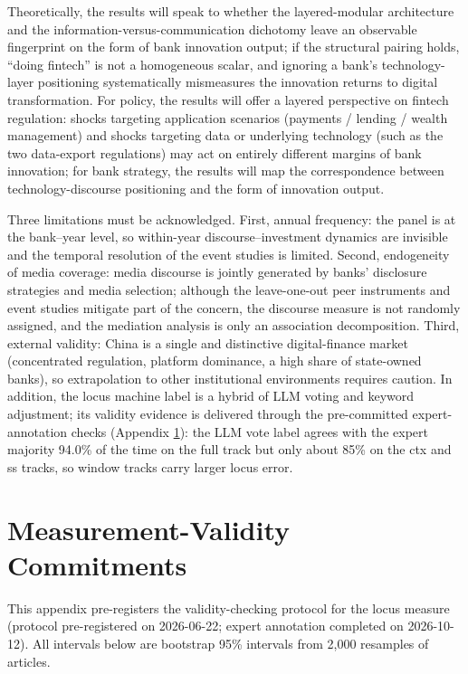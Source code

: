 Theoretically, the results will speak to whether the layered-modular architecture
\parencite{yoo2010layered} and the information-versus-communication dichotomy
\parencite{boot2021fintech} leave an observable fingerprint on the form of bank
innovation output; if the structural pairing holds, ``doing fintech'' is not a
homogeneous scalar, and ignoring a bank's technology-layer positioning systematically
mismeasures the innovation returns to digital transformation. For policy, the results
will offer a layered perspective on fintech regulation: shocks targeting application
scenarios (payments / lending / wealth management) and shocks targeting data or
underlying technology (such as the two data-export regulations) may act on entirely
different margins of bank innovation; for bank strategy, the results will map the
correspondence between technology-discourse positioning and the form of innovation
output. 

Three limitations must be acknowledged. First, annual frequency: the panel is at the
bank--year level, so within-year discourse--investment dynamics are invisible and the
temporal resolution of the event studies is limited. Second, endogeneity of media
coverage: media discourse is jointly generated by banks' disclosure strategies and
media selection; although the leave-one-out peer instruments and event studies mitigate
part of the concern, the discourse measure is not randomly assigned, and the mediation
analysis is only an association decomposition. Third, external validity: China is a
single and distinctive digital-finance market (concentrated regulation, platform
dominance, a high share of state-owned banks), so extrapolation to other institutional
environments requires caution. In addition, the locus machine label is a hybrid of LLM
voting and keyword adjustment; its validity evidence is delivered through the
pre-committed expert-annotation checks (Appendix \ref{app:validity}): the LLM vote label
agrees with the expert majority 94.0\% of the time on the full track but only about 85\%
on the ctx and ss tracks, so window tracks carry larger locus error.

\appendix

\section{Measurement-Validity Commitments}\label{app:validity}

This appendix pre-registers the validity-checking protocol for the locus measure
(protocol pre-registered on 2026-06-22; expert annotation completed on 2026-10-12).
All intervals below are bootstrap 95\% intervals from 2{,}000 resamples of articles.

